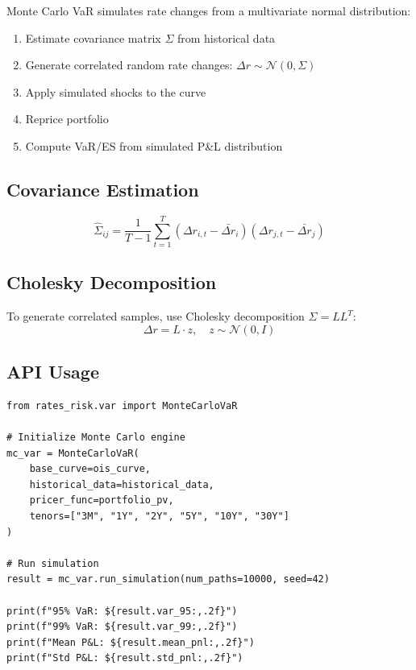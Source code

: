 \documentclass[12pt,a4paper]{report}
\begin{document}
Monte Carlo VaR simulates rate changes from a multivariate normal distribution:

\begin{enumerate}
    \item Estimate covariance matrix $\Sigma$ from historical data
    \item Generate correlated random rate changes: $\Delta r \sim \mathcal{N}(0, \Sigma)$
    \item Apply simulated shocks to the curve
    \item Reprice portfolio
    \item Compute VaR/ES from simulated P\&L distribution
\end{enumerate}

\subsection{Covariance Estimation}

\begin{equation}
    \hat{\Sigma}_{ij} = \frac{1}{T-1} \sum_{t=1}^{T} (\Delta r_{i,t} - \bar{\Delta r}_i)(\Delta r_{j,t} - \bar{\Delta r}_j)
\end{equation}

\subsection{Cholesky Decomposition}

To generate correlated samples, use Cholesky decomposition $\Sigma = LL^T$:
\begin{equation}
    \Delta r = L \cdot z, \quad z \sim \mathcal{N}(0, I)
\end{equation}

\subsection{API Usage}

\begin{lstlisting}
from rates_risk.var import MonteCarloVaR

# Initialize Monte Carlo engine
mc_var = MonteCarloVaR(
    base_curve=ois_curve,
    historical_data=historical_data,
    pricer_func=portfolio_pv,
    tenors=["3M", "1Y", "2Y", "5Y", "10Y", "30Y"]
)

# Run simulation
result = mc_var.run_simulation(num_paths=10000, seed=42)

print(f"95% VaR: ${result.var_95:,.2f}")
print(f"99% VaR: ${result.var_99:,.2f}")
print(f"Mean P&L: ${result.mean_pnl:,.2f}")
print(f"Std P&L: ${result.std_pnl:,.2f}")
\end{lstlisting}
\end{document}
